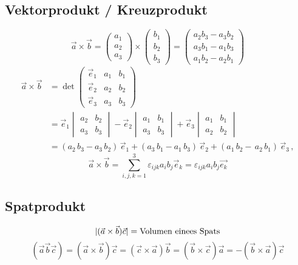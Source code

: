 \documentclass[11pt]{article}
\DeclarePairedDelimiter\abs{\lvert}{\rvert}%
\begin{document}
\subsection{Vektorprodukt / Kreuzprodukt}
\label{sec-13-4}
\begin{equation}
\vec{a}\times\vec{b}
=
\begin{pmatrix}a_1 \\ a_2 \\ a_3\end{pmatrix}
\times
\begin{pmatrix}b_1 \\ b_2 \\ b_3 \end{pmatrix}
=
\begin{pmatrix}
a_2b_3 - a_3b_2 \\
a_3b_1 - a_1b_3 \\
a_1b_2 - a_2b_1
\end{pmatrix}
\end{equation}
  \begin{align}
  \vec a \times \vec b &=\det \begin{pmatrix}\vec e_1 & a_1 & b_1 \\ \vec e_2 & a_2 & b_2 \\ \vec e_3 & a_3 & b_3\end{pmatrix}\\
  &= \vec e_1 \begin{vmatrix} a_2 & b_2 \\ a_3 & b_3 \end{vmatrix}
- \vec e_2 \begin{vmatrix} a_1 & b_1 \\ a_3 & b_3 \end{vmatrix}
+ \vec e_3 \begin{vmatrix} a_1 & b_1 \\ a_2 & b_2 \end{vmatrix} \\
&= (a_2 \,b_3 - a_3 \, b_2) \, \vec e_1 + (a_3 \, b_1 - a_1 \, b_3) \, \vec e_2 + (a_1 \, b_2 - \, a_2 \, b_1) \, \vec e_3 \,,
\end{align}
\[\vec{a}\times\vec{b} = \sum_{i,j,k=1}^3 \varepsilon_{ijk} a_i b_j \vec e_k = \varepsilon_{ijk}a_i b_j \vec{e_k}\]
\subsection{Spatprodukt}
\label{sec-13-5}
\[\abs{( \vec{a} \times \vec{b} ) \vec{c}} = \text{Volumen einees Spats}\]
\[(\vec{a}\vec{b}\vec{c})=(\vec{a}\times\vec{b})\vec{c}=(\vec{c}\times\vec{a})\vec{b}=(\vec{b}\times\vec{c})\vec{a}=-(\vec{b}\times\vec{a})\vec{c}\]
\end{document}
